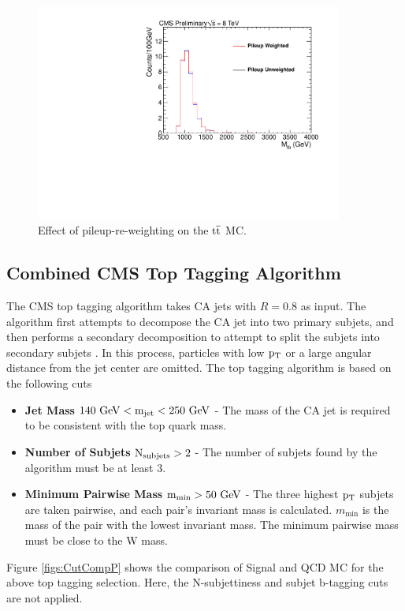 \begin{figure}[htcb]
\centering
\includegraphics[width=0.9\textwidth]{AN-13-004/figs/TTbar_PileupComp.pdf}
\caption{Effect of pileup-re-weighting on the $\mathrm{t\overline{t}}$ MC.}
\label{figs:pileup3ttbar}
\end{figure}



\subsection{Combined CMS Top Tagging Algorithm}
\label{sec:toptagging}
\label{sec:subjetSF}

The CMS top tagging algorithm takes CA jets with $R = 0.8$ as input.  
The algorithm first attempts to decompose the CA jet into two primary subjets, and then 
performs a secondary decomposition to attempt to split the subjets into secondary subjets \cite{JME13007}.
In this process, particles with low $\mathrm{p_{T}}$ or a large angular distance from the jet center are omitted.
The top tagging algorithm is based on the following cuts

\begin{itemize}
\item {\bf Jet Mass}  $\mathrm{\boldmath 140~\mathrm{GeV} < m_{\text{jet}} < 250~\mathrm{GeV}}$ - The mass of the CA jet is required to be consistent with the top quark mass. 
\item {\bf Number of Subjets}  $\mathrm{\boldmath N_{\text{subjets}} > 2}$ - The number of subjets found by the algorithm must be at least 3.
\item {\bf Minimum Pairwise Mass} $\mathrm{\boldmath m_{\text{min}} > 50~\mathrm{GeV}}$  - The three highest $\mathrm{p_{T}}$ subjets are
taken pairwise, and each pair's invariant mass is calculated. $m_{\text{min}}$ is the mass of the pair with the lowest invariant mass. The minimum pairwise mass must be close to the W mass.   
\end{itemize}
Figure \ref{figs:CutCompP} shows the comparison of Signal and QCD MC for the above top tagging selection. Here, the N-subjettiness and subjet b-tagging cuts are not applied.

